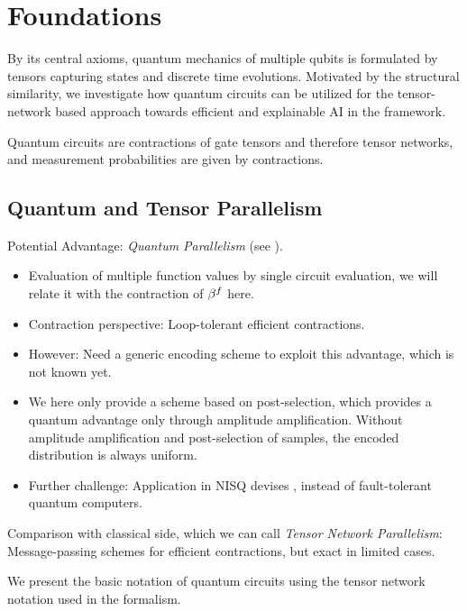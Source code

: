 \section{Foundations}

By its central axioms, quantum mechanics of multiple qubits is formulated by tensors capturing states and discrete time evolutions.
Motivated by the structural similarity, we investigate how quantum circuits can be utilized for the tensor-network based approach towards efficient and explainable AI in the \tnreason{} framework.

Quantum circuits are contractions of gate tensors and therefore tensor networks, and measurement probabilities are given by contractions.


\subsection{Quantum and Tensor Parallelism}


Potential Advantage: \emph{Quantum Parallelism} (see \cite[Section 3.2.5]{schuld_machine_2021}).
\begin{itemize}
    \item Evaluation of multiple function values by single circuit evaluation, we will relate it with the contraction of $\beta^{f}$ here.
    \item Contraction perspective: Loop-tolerant efficient contractions.
    \item However: Need a generic encoding scheme to exploit this advantage, which is not known yet.
    \item We here only provide a scheme based on post-selection, which provides a quantum advantage only through amplitude amplification.
    Without amplitude amplification and post-selection of samples, the encoded distribution is always uniform.
    \item Further challenge: Application in NISQ devises \cite{preskill_quantum_2018}, instead of fault-tolerant quantum computers.
\end{itemize}
Comparison with classical side, which we can call \emph{Tensor Network Parallelism}:
Message-passing schemes for efficient contractions, but exact in limited cases.


We present the basic notation of quantum circuits using the tensor network notation used in the \tnreason{} formalism.

